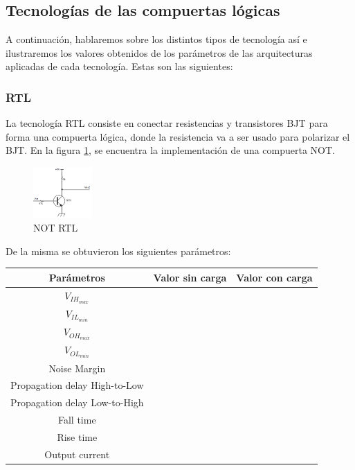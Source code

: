\subsection{Tecnologías de las compuertas lógicas}
A continuación, hablaremos sobre los distintos tipos de tecnología así e ilustraremos los valores obtenidos de los parámetros de las arquitecturas aplicadas de cada tecnología. Estas son las siguientes:

\subsubsection{RTL}
La tecnología RTL consiste en conectar resistencias y transistores BJT para forma una compuerta lógica, donde la resistencia va a ser usado para polarizar el BJT. En la figura \ref{fig:eje1_1}, se encuentra la implementación de una compuerta NOT.
\begin{figure}[H]
	\centering
	\includegraphics[width=0.2\textwidth]{Ejercicio1/RTL.png}
	\caption{NOT RTL}
	\label{fig:eje1_1}
\end{figure}
De la misma se obtuvieron los siguientes parámetros:
\begin{table}[H]
	\centering
	\begin{tabular}{|c|c|c|}
		\hline
		Parámetros & Valor sin carga & Valor con carga\\
		\hline
		$V_{IH_{max}}$ & & \\
		\hline
		$V_{IL_{min}}$ & & \\
		\hline
		$V_{OH_{max}}$ & & \\
		\hline
		$V_{OL_{min}}$ & & \\
		\hline
		Noise Margin & & \\
		\hline
		Propagation delay High-to-Low & & \\
		\hline
		Propagation delay Low-to-High & & \\
		\hline
		Fall time & & \\
		\hline
		Rise time & & \\
		\hline
		Output current & & \\
		\hline
	\end{tabular}
\end{table}

